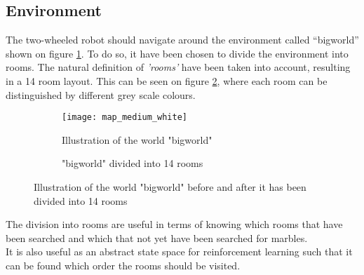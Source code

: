 \documentclass[../Head/Main.tex]{subfiles}
\begin{document}
\subsection{Environment}
\label{subsec:design_environment}
The two-wheeled robot should navigate around the environment called “bigworld” shown on figure \ref{fig:bigworld_white}. To do so, it have been chosen to divide the environment into rooms. The natural definition of \textit{'rooms'} have been taken into account, resulting in a 14 room layout. This can be seen on figure \ref{fig:bigworld_14_rooms}, where each room can be distinguished by different grey scale colours. 

\begin{figure}[H]
	\centering
	\begin{subfigure}[b]{0.49\textwidth}
		\centering
		\texttt{[image: map\_medium\_white]}
		\caption{Illustration of the world "bigworld"}
		\label{fig:bigworld_white}
	\end{subfigure}
	\hfill	
	\begin{subfigure}[b]{0.49\textwidth}
		\centering
		\caption{"bigworld" divided into 14 rooms}
		\label{fig:bigworld_14_rooms}
	\end{subfigure}
	\caption{Illustration of the world "bigworld" before and after it has been divided into 14 rooms}
	\label{fig:bigworld}
\end{figure}
The division into rooms are useful in terms of knowing which rooms that have been searched and which that not yet have been searched for marbles.\\
It is also useful as an abstract state space for reinforcement learning such that it can be found which order the rooms  should be visited.
\end{document}
